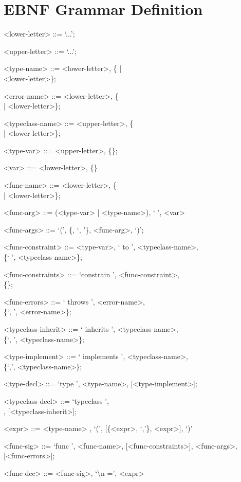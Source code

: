 \documentclass{acm_proc_article-sp}
\begin{document}
\section{EBNF Grammar Definition}
    \label{app:Grammar}
    \begin{grammar}

    <lower-letter> ::= `...';

    <upper-letter> ::= `...';

    <type-name> ::= <lower-letter>, \{<upper-letter> |
    \\ <lower-letter>\};

    <error-name> ::= <lower-letter>, \{<upper-letter>
    \\ | <lower-letter>\};

    <typeclass-name> ::= <upper-letter>, \{<upper-letter>
    \\ | <lower-letter>\};

    <type-var> ::= <upper-letter>, \{<upper-letter>\};

    <var> ::= <lower-letter>, \{<lower-letter>\}

    <func-name> ::= <lower-letter>, \{<upper-letter>
    \\ | <lower-letter>\};

    <func-arg> ::= (<type-var> | <type-name>), ` ', <var>

    <func-args> ::= `(', \{<func-arg>, `, '\}, <func-arg>, `)';

    <func-constraint> ::= <type-var>, ` to ', <typeclass-name>,
    \\ \{` ', <typeclass-name>\};

    <func-constraints> ::= `constrain ', <func-constraint>,
    \\ \{<func-constraint>\};

    <func-errors> ::= ` throws ', <error-name>,
    \\ \{`, ', <error-name>\};

    <typeclass-inherit> ::= ` inherits ', <typeclass-name>,
    \\ \{`, ', <typeclass-name>\};

    <type-implement> ::= ` implements ', <typeclass-name>,
     \\\{`,', <typeclass-name>\};

    <type-decl> ::= `type ', <type-name>, [<type-implement>];

    <typeclass-decl> ::= `typeclass ',
    \\<typeclass-name>, [<typeclass-inherit>];

    <expr> ::= <type-name>
    , `(', [\{<expr>, `,'\}, <expr>], `)'

    <func-sig> ::= `func ', <func-name>, [<func-constraints>], <func-args>, [<func-errors>];

    <func-dec> ::= <func-sig>, `\textbackslash n =', <expr> 

    \end{grammar}



\balancecolumns
\end{document}

